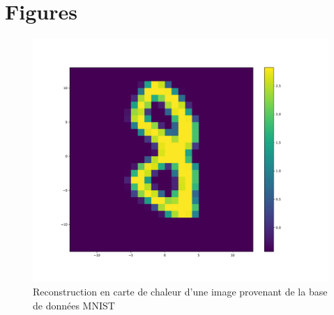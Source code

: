 
\chapter{Figures} %

\label{Figures} %



\begin{table}
\caption[Tableau]{Matériel utilisé pour réaliser les modélisations}
\label{tab:materiel}
\end{table}

\begin{figure}[th]
\centering
\includegraphics[scale=0.4]{Figures/MNIST_28}
\decoRule %
\caption[Figure]{Reconstruction en carte de chaleur d'une image provenant de la base de données MNIST}
\label{fig:MNIST_28}
\end{figure}

